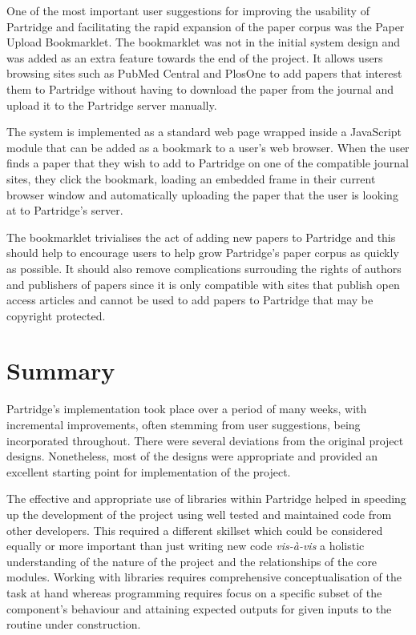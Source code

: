 One of the most important user suggestions for improving the usability of
Partridge and facilitating the rapid expansion of the paper corpus was the
Paper Upload Bookmarklet. The bookmarklet was not in the initial system design
and was added as an extra feature towards the end of the project. It allows
users browsing sites such as PubMed Central and PlosOne to add papers that
interest them to Partridge without having to download the paper from the
journal and upload it to the Partridge server manually. 

The system is implemented as a standard web page wrapped inside a JavaScript
module that can be added as a bookmark to a user's web browser. When the user
finds a paper that they wish to add to Partridge on one of the compatible
journal sites, they click the bookmark, loading an embedded frame in their
current browser window and automatically uploading the paper that the user is
looking at to Partridge's server. 

The bookmarklet trivialises the act of adding new papers to Partridge and this
should help to encourage users to help grow Partridge's paper corpus as quickly
as possible. It should also remove complications surrouding the rights of authors and
publishers of papers since it is only compatible with sites that publish open
access articles and cannot be used to add papers to Partridge that may be
copyright protected.

\section{Summary}

Partridge's implementation took place over a period of many weeks, with
incremental improvements, often stemming from user suggestions, being
incorporated throughout. There were several deviations from the original
project designs. Nonetheless, most of the designs were appropriate and provided
an excellent starting point for implementation of the project.

The effective and appropriate use of libraries within Partridge helped in
speeding up the development of the project using well tested and maintained
code from other developers. This required a different skillset which could be
considered equally or more important than just writing new code
\emph{vis-à-vis} a holistic understanding of the nature of the project and the
relationships of the core modules. Working with libraries requires
comprehensive conceptualisation of the task at hand whereas programming
requires focus on a specific subset of the component's behaviour and attaining
expected outputs for given inputs to the routine under construction.
